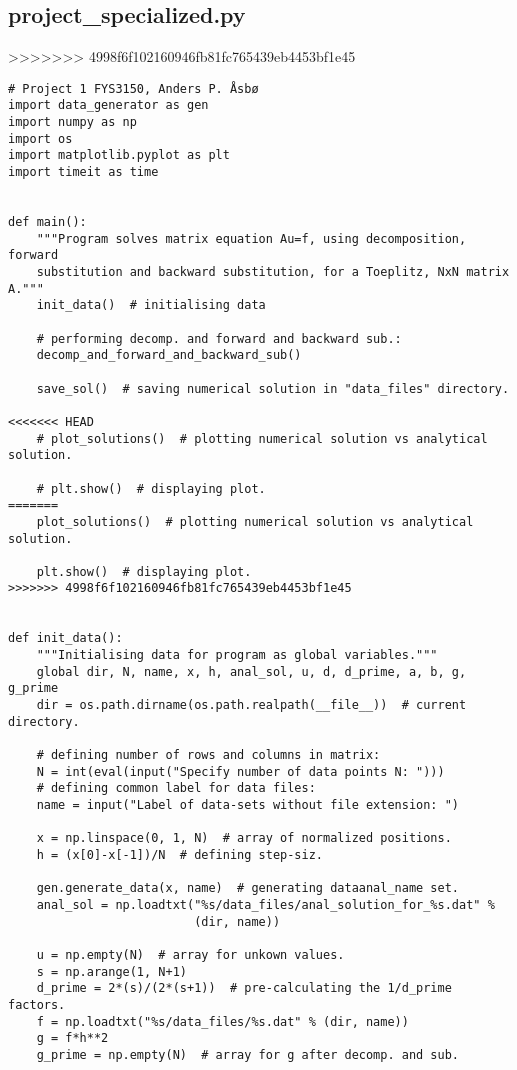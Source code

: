 \documentclass[english,notitlepage]{revtex4-1}  %
\begin{document}
\subsection{project\_specialized.py}\label{A:12}
>>>>>>> 4998f6f102160946fb81fc765439eb4453bf1e45
\begin{lstlisting}
# Project 1 FYS3150, Anders P. Åsbø
import data_generator as gen
import numpy as np
import os
import matplotlib.pyplot as plt
import timeit as time


def main():
    """Program solves matrix equation Au=f, using decomposition, forward
    substitution and backward substitution, for a Toeplitz, NxN matrix A."""
    init_data()  # initialising data

    # performing decomp. and forward and backward sub.:
    decomp_and_forward_and_backward_sub()

    save_sol()  # saving numerical solution in "data_files" directory.

<<<<<<< HEAD
    # plot_solutions()  # plotting numerical solution vs analytical solution.

    # plt.show()  # displaying plot.
=======
    plot_solutions()  # plotting numerical solution vs analytical solution.

    plt.show()  # displaying plot.
>>>>>>> 4998f6f102160946fb81fc765439eb4453bf1e45


def init_data():
    """Initialising data for program as global variables."""
    global dir, N, name, x, h, anal_sol, u, d, d_prime, a, b, g, g_prime
    dir = os.path.dirname(os.path.realpath(__file__))  # current directory.

    # defining number of rows and columns in matrix:
    N = int(eval(input("Specify number of data points N: ")))
    # defining common label for data files:
    name = input("Label of data-sets without file extension: ")

    x = np.linspace(0, 1, N)  # array of normalized positions.
    h = (x[0]-x[-1])/N  # defining step-siz.

    gen.generate_data(x, name)  # generating dataanal_name set.
    anal_sol = np.loadtxt("%s/data_files/anal_solution_for_%s.dat" %
                          (dir, name))

    u = np.empty(N)  # array for unkown values.
    s = np.arange(1, N+1)
    d_prime = 2*(s)/(2*(s+1))  # pre-calculating the 1/d_prime factors.
    f = np.loadtxt("%s/data_files/%s.dat" % (dir, name))
    g = f*h**2
    g_prime = np.empty(N)  # array for g after decomp. and sub.



\end{lstlisting}
\end{document}
